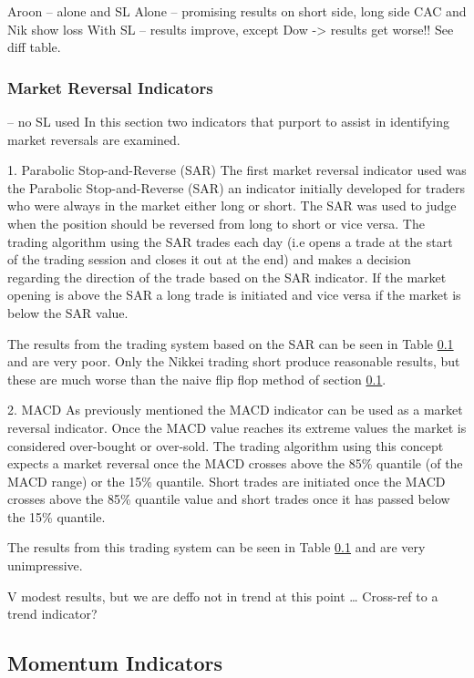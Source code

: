 Aroon – alone and SL
Alone – promising results on short side, long side CAC and Nik show loss
With SL – results improve, except Dow -> results get worse!!  See diff table.

\subsubsection{Market Reversal Indicators} – no SL used
In this section  two indicators that purport to assist in identifying market reversals are examined.

1. Parabolic Stop-and-Reverse (SAR)
The first market reversal indicator used was the Parabolic Stop-and-Reverse (SAR) an indicator initially developed for traders who were always in the market either long or short. The SAR was used to judge when the  position should be reversed from long to short or vice versa. The trading algorithm using the SAR trades each day (i.e opens a trade at the start of the trading session and closes it out at the end) and makes a decision regarding the direction of the trade based on the SAR indicator. If the market opening is above the SAR a long trade is initiated and vice versa if the market is below the SAR value.

The results from the trading system based on the SAR can be seen in Table \ref{} and are very poor. Only the Nikkei trading short produce reasonable results, but these are much worse than the naive flip flop method of section \ref{}.

2.	MACD
As previously mentioned the MACD indicator can be used as a market reversal indicator. Once the MACD value reaches its extreme values the market is considered over-bought or over-sold. The trading algorithm using this concept expects a market reversal once the MACD crosses above the 85\% quantile (of the MACD range) or the 15\% quantile. Short trades are initiated once the MACD crosses above the 85\% quantile value and short trades once it has passed below the 15\% quantile.

The results from this trading system can be seen in Table \ref{} and are very unimpressive. 

V modest results, but we are deffo not in trend at this point …  Cross-ref to a trend indicator?

\subsection{Momentum Indicators}

